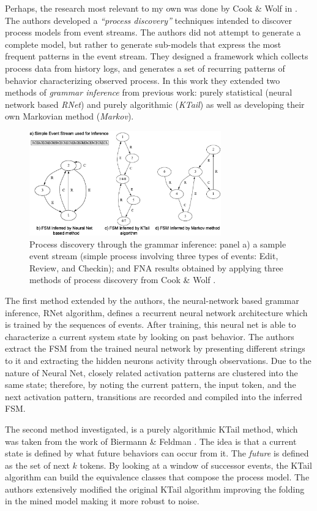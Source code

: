 \documentclass{sig-alternate}
\begin{document}
Perhaps, the research most relevant to my own was done by Cook \& Wolf in \cite{citeulike:328044}. The authors developed a \textit{``process discovery''} techniques intended to discover process models from event streams. The authors did not attempt to generate a complete model, but rather to generate sub-models that express the most frequent patterns in the event stream. They designed a framework which collects process data from history logs, and generates a set of recurring patterns of behavior characterizing observed process. In this work they extended two methods of \textit{grammar inference} from previous work: purely statistical (neural network based \textit{RNet}) and purely algorithmic (\textit{KTail}) as well as developing their own Markovian method (\textit{Markov}). 

\begin{figure}[tbp]
   \centering
   \includegraphics[height=45mm]{inference.eps}
   \caption{Process discovery through the grammar inference: panel a) a sample event stream (simple process involving three types of events: Edit, Review, and Checkin); and FNA results obtained by applying three methods of process discovery from Cook \& Wolf \cite{citeulike:328044}.}
   \label{fig:inference}
\end{figure}

The first method extended by the authors, the neural-network based grammar inference, RNet algorithm, defines a recurrent neural network architecture which is trained by the sequences of events. After training, this neural net is able to characterize a current system state by looking on past behavior. The authors extract the FSM from the trained neural network by presenting different strings to it and extracting the hidden neurons activity through observations. Due to the nature of Neural Net, closely related activation patterns are clustered into the same state; therefore, by noting the current pattern, the input token, and the next activation pattern, transitions are recorded and compiled into the inferred FSM.

The second method investigated, is a purely algorithmic KTail method, which was taken from the work of Biermann \& Feldman \cite{citeulike:5120603}. The idea is that a current state is defined by what future behaviors can occur from it. The \textit{future} is defined as the set of next $k$ tokens. By looking at a window of successor events, the KTail algorithm can build the equivalence classes that compose the process model. The authors extensively modified the original KTail algorithm improving the folding in the mined model making it more robust to noise.
\end{document}
